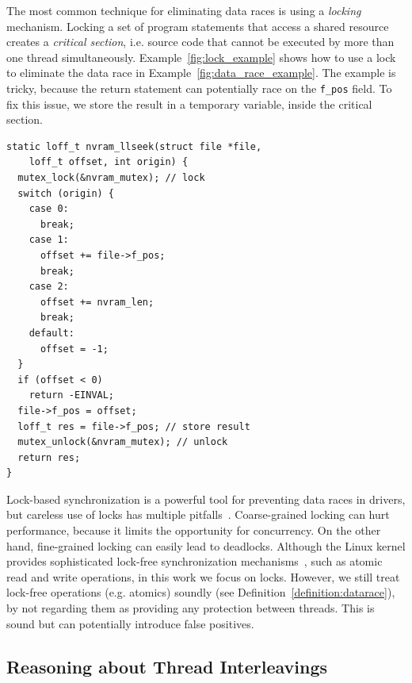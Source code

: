 The most common technique for eliminating data races is using a \emph{locking} mechanism. Locking a set of program statements that access a shared resource creates a \emph{critical section}, i.e. source code that cannot be executed by more than one thread simultaneously. Example~\ref{fig:lock_example} shows how to use a lock to eliminate the data race in Example~\ref{fig:data_race_example}. The example is tricky, because the return statement can potentially race on the \texttt{f\_pos} field. To fix this issue, we store the result in a temporary variable, inside the critical section.

\begin{lstlisting}[caption = Using a lock to eliminate the data races., label = fig:lock_example]
static loff_t nvram_llseek(struct file *file,
    loff_t offset, int origin) {
  mutex_lock(&nvram_mutex); // lock
  switch (origin) {
    case 0:
      break;
    case 1:
      offset += file->f_pos;
      break;
    case 2:
      offset += nvram_len;
      break;
    default:
      offset = -1;
  }
  if (offset < 0)
    return -EINVAL;
  file->f_pos = offset;
  loff_t res = file->f_pos; // store result
  mutex_unlock(&nvram_mutex); // unlock
  return res;
}
\end{lstlisting}

Lock-based synchronization is a powerful tool for preventing data races in drivers, but careless use of locks has multiple pitfalls~\cite{sutter2005software}. Coarse-grained locking can hurt performance, because it limits the opportunity for concurrency. On the other hand, fine-grained locking can easily lead to deadlocks. Although the Linux kernel provides sophisticated lock-free synchronization mechanisms~\cite{corbet2005linux}, such as atomic read and write operations, in this work we focus on locks. However, we still treat lock-free operations (e.g. atomics) soundly (see Definition~\ref{definition:datarace}), by not regarding them as providing any protection between threads. This is sound but can potentially introduce false positives.


\subsection{Reasoning about Thread Interleavings}
\label{bg:happensbefore}

